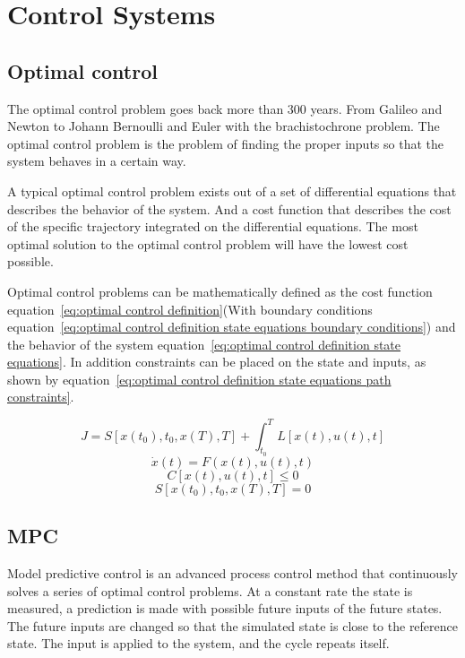 \chapter{Control Systems}
\section{Optimal control}
	The optimal control problem goes back more than 300 years. From Galileo and Newton to Johann Bernoulli and Euler with the brachistochrone problem. The optimal control problem is the problem of finding the proper inputs so that the system behaves in a certain way.
	
	A typical optimal control problem exists out of a set of differential equations that describes the behavior of the system. And a cost function that describes the cost of the specific trajectory integrated on the differential equations. The most optimal solution to the optimal control problem will have the lowest cost possible.
	
	Optimal control problems can be mathematically defined as the cost function equation~\ref{eq:optimal control definition}(With boundary conditions equation~\ref{eq:optimal control definition state equations boundary conditions})  and the behavior of the system equation~\ref{eq:optimal control definition state equations}. In addition constraints can be placed on the state and inputs, as shown by equation~\ref{eq:optimal control definition state equations path constraints}. 
	
	\begin{equation}
		J = S[x(t_0),t_0,x(T),T] + \int_{t_0}^{T} L[x(t),u(t),t]
		\label{eq:optimal control definition}
	\end{equation}
	\begin{equation}
		\dot{x}(t) = F(x(t),u(t),t)
		\label{eq:optimal control definition state equations}
	\end{equation}
	\begin{equation}
		C[x(t),u(t),t]\le 0
		\label{eq:optimal control definition state equations path constraints}
	\end{equation}
	\begin{equation}
		S[x(t_0),t_0,x(T),T]=0
		\label{eq:optimal control definition state equations boundary conditions}
	\end{equation}

\section{MPC}
	Model predictive control is an advanced process control method that continuously solves a series of optimal control problems. At a constant rate the state is measured, a prediction is made with possible future inputs of the future states. The future inputs are changed so that the simulated state is close to the reference state. The input is applied to the system, and the cycle repeats itself.
	
